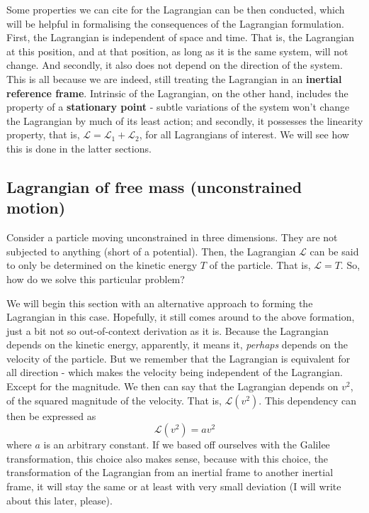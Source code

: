 Some properties we can cite for the Lagrangian can be then conducted, which will be helpful in formalising the consequences of the Lagrangian formulation. First, the Lagrangian is independent of space and time. That is, the Lagrangian at this position, and at that position, as long as it is the same system, will not change. And secondly, it also does not depend on the direction of the system. This is all because we are indeed, still treating the Lagrangian in an \textbf{inertial reference frame}. Intrinsic of the Lagrangian, on the other hand, includes the property of a \textbf{stationary point} - subtle variations of the system won't change the Lagrangian by much of its least action; and secondly, it possesses the linearity property, that is, $\mathcal{L}=\mathcal{L}_{1}+\mathcal{L}_{2}$, for all Lagrangians of interest. We will see how this is done in the latter sections. 

\subsection{Lagrangian of free mass (unconstrained motion)}

Consider a particle moving unconstrained in three dimensions. They are not subjected to anything (short of a potential). Then, the Lagrangian $\mathcal{L}$ can be said to only be determined on the kinetic energy $T$ of the particle. That is, $\mathcal{L}=T$. So, how do we solve this particular problem? 

We will begin this section with an alternative approach to forming the Lagrangian in this case. Hopefully, it still comes around to the above formation, just a bit not so out-of-context derivation as it is. Because the Lagrangian depends on the kinetic energy, apparently, it means it, \textit{perhaps} depends on the velocity of the particle. But we remember that the Lagrangian is equivalent for all direction - which makes the velocity being independent of the Lagrangian. Except for the magnitude. We then can say that the Lagrangian depends on $v^{2}$, of the squared magnitude of the velocity. That is, $\mathcal{L}(v^2)$. This dependency can then be expressed as 
$$
\mathcal{L}(v^{2}) = av^2
$$
where $a$ is an arbitrary constant. If we based off ourselves with the Galilee transformation, this choice also makes sense, because with this choice, the transformation of the Lagrangian from an inertial frame to another inertial frame, it will stay the same or at least with very small deviation (I will write about this later, please). 

